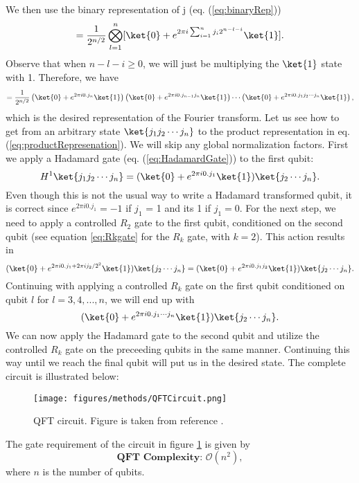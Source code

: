 We then use the binary representation of j (eq. (\ref{eq:binaryRep}))
\begin{align*}
    =\frac{1}{2^{n/2}} \bigotimes_{l=1}^n [\ket{0} + e^{2\pi i \sum_{i=1}^n j_i 2^{n-l-i}}\ket{1} ]. \notag \\
\end{align*}
Observe that when $n-l-i \geq 0$, we will just be multiplying the $\ket{1}$ state with 1. Therefore, we have
\begin{align}
    \label{eq:productRepresenation}
    = \frac{1}{2^{n/2}} \left( \ket{0} + e^{2\pi i 0.j_n}\ket{1} \right)\left(\ket{0} + e^{2\pi i 0.j_{n-1}j_n}\ket{1} \right)\cdots \left(\ket{0} + e^{2\pi i 0.j_1j_2\cdots j_n}\ket{1} \right),
\end{align}
which is the desired representation of the Fourier transform.
Let us see how to get from an arbitrary state $\ket{j_1j_2\cdots j_n}$ to the product representation in eq. (\ref{eq:productRepresenation}). We will skip any global normalization factors.
First we apply a Hadamard gate (eq. (\ref{eq:HadamardGate})) to the first qubit:
$$H^1 \ket{j_1 j_2 \cdots j_n} = (\ket{0} + e^{2\pi i 0.j_1}\ket{1})\ket{j_2\cdots j_n}. $$
Even though this is not the usual way to write a Hadamard transformed qubit, it is correct since $e^{2\pi i 0.j_1} = -1$ if $j_1$ = 1 and its 1 if $j_1 = 0$. For the next step, we need to apply a controlled $R_2$ gate to the first qubit, conditioned on the second qubit (see equation \ref{eq:Rkgate} for the $R_k$ gate, with $k = 2$). This action results in 
$$(\ket{0} + e^{2\pi i 0.j_1 + 2\pi i j_2/2^2}\ket{1})\ket{j_2\cdots j_n} = (\ket{0} + e^{2\pi i 0.j_1j_2}\ket{1})\ket{j_2\cdots j_n}. $$
Continuing with applying a controlled $R_k$ gate on the first qubit conditioned on qubit $l$ for $l=3,4,...,n$, we will end up with
$$ (\ket{0} + e^{2\pi i 0.j_1\cdots j_n}\ket{1})\ket{j_2\cdots j_n}.$$
We can now apply the Hadamard gate to the second qubit and utilize the controlled $R_k$ gate on the preceeding qubits in the same manner. Continuing this way until we reach the final qubit will put us in the desired state.
The complete circuit is illustrated below:
\begin{figure}[H]
    \centering
    \texttt{[image: figures/methods/QFTCircuit.png]}
    \caption{QFT circuit. Figure is taken from reference \cite{NielsenAndChuang}.}
    \label{fig:QFTCircuit}
\end{figure}
The gate requirement of the circuit in figure \ref{fig:QFTCircuit} is given by \cite{NielsenAndChuang}
\begin{equation}
    \label{eq:QFTcomplexity}
    \textbf{QFT Complexity: } \mathcal{O}(n^2),
\end{equation}
where $n$ is the number of qubits.
